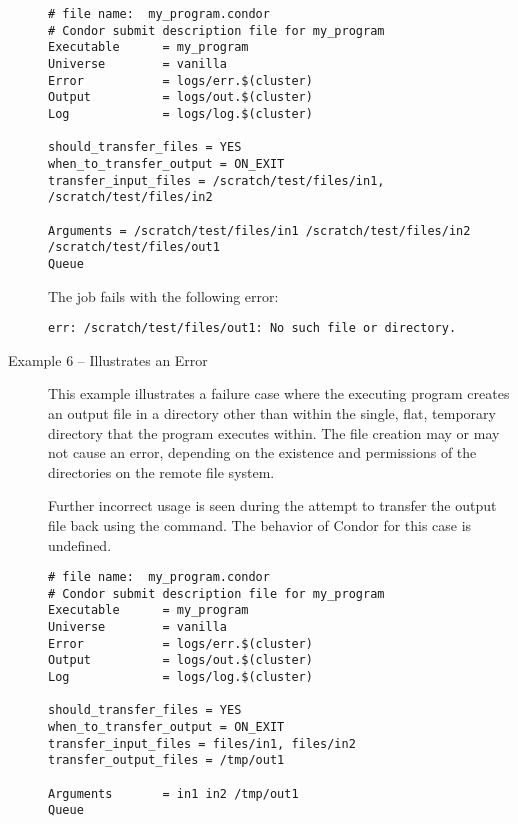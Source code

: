 \begin{description}
\footnotesize
\begin{verbatim}
# file name:  my_program.condor
# Condor submit description file for my_program
Executable      = my_program
Universe        = vanilla
Error           = logs/err.$(cluster)
Output          = logs/out.$(cluster)
Log             = logs/log.$(cluster)

should_transfer_files = YES
when_to_transfer_output = ON_EXIT
transfer_input_files = /scratch/test/files/in1, /scratch/test/files/in2

Arguments = /scratch/test/files/in1 /scratch/test/files/in2 /scratch/test/files/out1
Queue
\end{verbatim}
\normalsize

The job fails with the following error:
\footnotesize
\begin{verbatim}
err: /scratch/test/files/out1: No such file or directory.
\end{verbatim}
\normalsize


\item[Example 6 -- Illustrates an Error]

This example illustrates a failure case
where the executing program creates an output file in a directory
other than within the single, flat, temporary directory that the 
program executes within.
The file creation may or may not cause an error,
depending on the existence and permissions
of the directories on the remote file system.

Further incorrect usage is seen during
the attempt to transfer the output file back 
using the  command.
The behavior of Condor for this case is undefined.

\footnotesize
\begin{verbatim}
# file name:  my_program.condor
# Condor submit description file for my_program
Executable      = my_program
Universe        = vanilla
Error           = logs/err.$(cluster)
Output          = logs/out.$(cluster)
Log             = logs/log.$(cluster)

should_transfer_files = YES
when_to_transfer_output = ON_EXIT
transfer_input_files = files/in1, files/in2
transfer_output_files = /tmp/out1

Arguments       = in1 in2 /tmp/out1
Queue
\end{verbatim}
\normalsize

\end{description}

